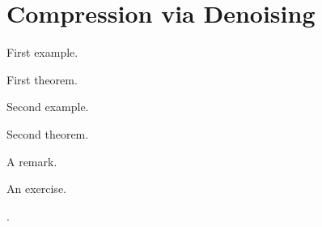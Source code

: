 \documentclass{book}
\begin{document}
\setcounter{chapter}{3}
\setcounter{section}{1}
\section{Compression via Denoising}
\begin{example}[高斯分布的熵]\label{ex:entropy}
  First example.
\end{example}
\begin{theorem}[扩散]\label{thm:diffusion}
  First theorem.
\end{theorem}
\begin{example}[向高斯混合添加噪声]\label{ex:noise}
  Second example.
\end{example}
\begin{theorem}\label{thm:simplified}
  Second theorem.
\end{theorem}
\begin{remark}A remark.\end{remark}
\begin{exercise}An exercise.\end{exercise}
.
\end{document}
